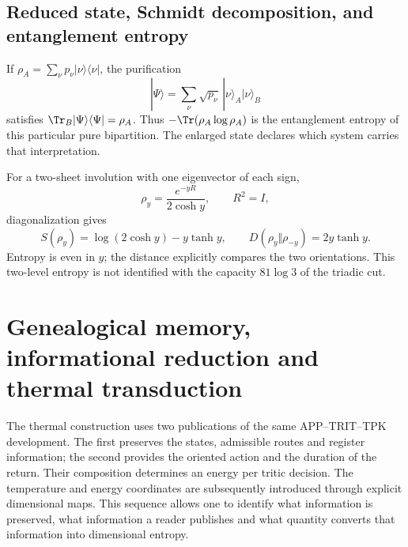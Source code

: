 

\section{Reduced state, Schmidt decomposition, and entanglement entropy}
If $\rho_A=\sum_\nu p_\nu|\nu\rangle\langle\nu|$,
the purification
\[
|\Psi\rangle=\sum_\nu\sqrt{p_\nu}\,
|\nu\rangle_A|\nu\rangle_B
\]
satisfies $\Tr_B|\Psi\rangle\langle\Psi|=\rho_A$.
Thus $-\Tr(\rho_A\log\rho_A)$ is the entanglement entropy
of this particular pure bipartition. The enlarged state declares
which system carries that interpretation.

For a two-sheet involution with one eigenvector of each sign,
\[
\rho_y=\frac{e^{-yR}}{2\cosh y},\qquad R^2=I,
\]
diagonalization gives
\[
S(\rho_y)=\log(2\cosh y)-y\tanh y,\qquad
D(\rho_y\Vert\rho_{-y})=2y\tanh y.
\]
Entropy is even in $y$; the distance explicitly compares
the two orientations. This two-level entropy is not identified
with the capacity $81\log3$ of the triadic cut.




\chapter{Genealogical memory, informational reduction and thermal transduction}
\label{x_reciprocidad:v:ant:sec:ii-kb-aut-desarrollo}

The thermal construction uses two publications of the same
APP--TRIT--TPK development. The first preserves the states, admissible routes and
register information; the second provides the oriented action
and the duration of the return. Their composition determines an energy per
tritic decision. The temperature and energy coordinates are subsequently
introduced through explicit dimensional maps. This sequence
allows one to identify what information is preserved, what information a reader
publishes and what quantity converts that information into dimensional entropy.

